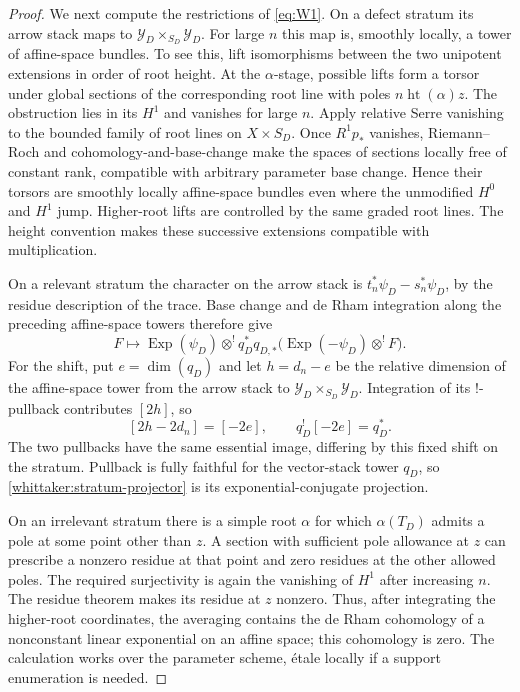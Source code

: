 \documentclass[11pt]{article}
\numberwithin{equation}{section}
\theoremstyle{definition}
\theoremstyle{remark}
\begin{document}
\begin{proof}
We next compute the restrictions of \eqref{eq:W1}. On a defect stratum its
arrow stack maps to $\mathcal Y_D\times_{S_D}\mathcal Y_D$. For large $n$
this map is, smoothly locally, a tower of affine-space bundles. To see
this, lift isomorphisms between the two unipotent extensions in order of
root height. At the $\alpha$-stage, possible lifts form a torsor under
global sections of the corresponding root line with poles
$n\operatorname{ht}(\alpha)z$. The obstruction lies in its $H^1$ and
vanishes for large $n$. Apply relative Serre vanishing to the bounded
family of root lines on $X\times S_D$. Once $R^1p_*$ vanishes,
Riemann--Roch and cohomology-and-base-change make the spaces of sections
locally free of constant rank, compatible with arbitrary parameter base
change. Hence their torsors are smoothly locally affine-space bundles
even where the unmodified $H^0$ and $H^1$ jump. Higher-root lifts are
controlled by the same graded root lines. The height convention makes these successive extensions
compatible with multiplication.

On a relevant stratum the character on the arrow stack is
$t_n^*\psi_D-s_n^*\psi_D$, by the residue description of the trace.
Base change and de Rham integration along the preceding affine-space
towers therefore give
\begin{equation}\label{whittaker:stratum-projector}
 F\longmapsto\operatorname{Exp}(\psi_D)\otimes^!
 q_D^*q_{D,*}\bigl(\operatorname{Exp}(-\psi_D)\otimes^!F\bigr).
\end{equation}
For the shift, put $e=\dim(q_D)$ and let $h=d_n-e$ be the relative
dimension of the affine-space tower from the arrow stack to
$\mathcal Y_D\times_{S_D}\mathcal Y_D$. Integration of its $!$-pullback
contributes $[2h]$, so
\[
 [2h-2d_n]=[-2e],\qquad q_D^![-2e]=q_D^*.
\]
The two pullbacks have the same essential image, differing by this fixed
shift on the stratum. Pullback is fully faithful for the vector-stack tower
$q_D$, so \eqref{whittaker:stratum-projector} is its exponential-conjugate
projection.

On an irrelevant stratum there is a simple root $\alpha$ for which
$\alpha(T_D)$ admits a pole at some point other than $z$. A section with
sufficient pole allowance at $z$ can prescribe a nonzero residue at that
point and zero residues at the other allowed poles. The required
surjectivity is again the vanishing of $H^1$ after increasing $n$.
The residue theorem makes its residue at $z$ nonzero. Thus, after
integrating the higher-root coordinates, the averaging contains the de
Rham cohomology of a nonconstant linear exponential on an affine space;
this cohomology is zero. The calculation works over the parameter scheme,
\'etale locally if a support enumeration is needed.


\end{proof}
\end{document}
